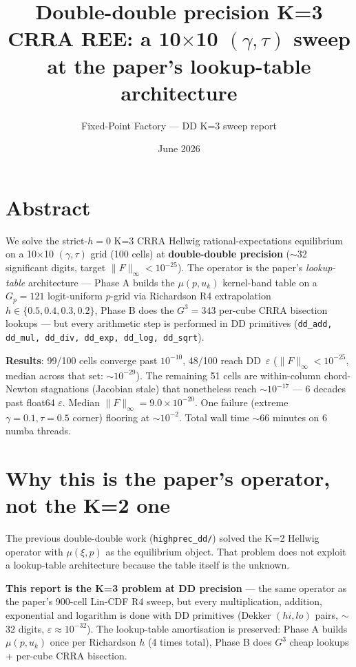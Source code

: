 \documentclass[11pt]{article}
\title{Double-double precision K=3 CRRA REE: a 10$\times$10 $(\gamma, \tau)$ sweep\\
       at the paper's lookup-table architecture}
\author{Fixed-Point Factory --- DD K=3 sweep report}
\date{June 2026}
\begin{document}
\maketitle

\section*{Abstract}

We solve the strict-$h{=}0$ K=3 CRRA Hellwig rational-expectations equilibrium
on a 10$\times$10 $(\gamma, \tau)$ grid (100 cells) at \textbf{double-double
precision} ($\sim$32 significant digits, target $\|F\|_\infty < 10^{-25}$). The
operator is the paper's \emph{lookup-table} architecture --- Phase A builds the
$\mu(p, u_k)$ kernel-band table on a $G_p{=}121$ logit-uniform $p$-grid via
Richardson R4 extrapolation $h \in \{0.5, 0.4, 0.3, 0.2\}$, Phase B does the
$G^3{=}343$ per-cube CRRA bisection lookups --- but every arithmetic step is
performed in DD primitives (\texttt{dd\_add, dd\_mul, dd\_div, dd\_exp, dd\_log,
dd\_sqrt}).

\textbf{Results}: 99/100 cells converge past $10^{-10}$, 48/100 reach
DD~$\varepsilon$ ($\|F\|_\infty < 10^{-25}$, median across that set: $\sim 10^{-29}$).
The remaining 51 cells are within-column chord-Newton stagnations (Jacobian
stale) that nonetheless reach $\sim 10^{-17}$ --- 6 decades past float64
$\varepsilon$. Median $\|F\|_\infty = 9.0 \times 10^{-20}$. One failure
(extreme $\gamma{=}0.1, \tau{=}0.5$ corner) flooring at $\sim 10^{-2}$. Total
wall time $\sim$66 minutes on 6 numba threads.

\section{Why this is the paper's operator, not the K=2 one}

The previous double-double work (\texttt{highprec\_dd/}) solved the K=2 Hellwig
operator with $\mu(\xi, p)$ as the equilibrium object. That problem does not
exploit a lookup-table architecture because the table itself is the unknown.

\textbf{This report is the K=3 problem at DD precision} --- the same operator
as the paper's 900-cell Lin-CDF R4 sweep, but every multiplication, addition,
exponential and logarithm is done with DD primitives (Dekker $(hi, lo)$ pairs,
$\sim$32 digits, $\varepsilon \!\approx\! 10^{-32}$). The lookup-table
amortisation is preserved: Phase A builds $\mu(p, u_k)$ once per Richardson
$h$ (4 times total), Phase B does $G^3$ cheap lookups + per-cube CRRA bisection.
\end{document}
